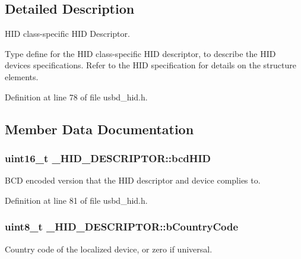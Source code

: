 \subsection{Detailed Description}
H\+ID class-\/specific H\+ID Descriptor. 

Type define for the H\+ID class-\/specific H\+ID descriptor, to describe the H\+ID device\textquotesingle{}s specifications. Refer to the H\+ID specification for details on the structure elements. 

Definition at line 78 of file usbd\+\_\+hid.\+h.



\subsection{Member Data Documentation}
\subsubsection[{\texorpdfstring{bcd\+H\+ID}{bcdHID}}]{\setlength{\rightskip}{0pt plus 5cm}uint16\+\_\+t \+\_\+\+H\+I\+D\+\_\+\+D\+E\+S\+C\+R\+I\+P\+T\+O\+R\+::bcd\+H\+ID}\hypertarget{struct__HID__DESCRIPTOR_acb02b2afae4c474d60d3ce5ea90d6b3d}{}\label{struct__HID__DESCRIPTOR_acb02b2afae4c474d60d3ce5ea90d6b3d}
B\+CD encoded version that the H\+ID descriptor and device complies to. 

Definition at line 81 of file usbd\+\_\+hid.\+h.

\subsubsection[{\texorpdfstring{b\+Country\+Code}{bCountryCode}}]{\setlength{\rightskip}{0pt plus 5cm}uint8\+\_\+t \+\_\+\+H\+I\+D\+\_\+\+D\+E\+S\+C\+R\+I\+P\+T\+O\+R\+::b\+Country\+Code}\hypertarget{struct__HID__DESCRIPTOR_a6d494d09bf37ea067da3a089f0c966ba}{}\label{struct__HID__DESCRIPTOR_a6d494d09bf37ea067da3a089f0c966ba}
Country code of the localized device, or zero if universal. 

